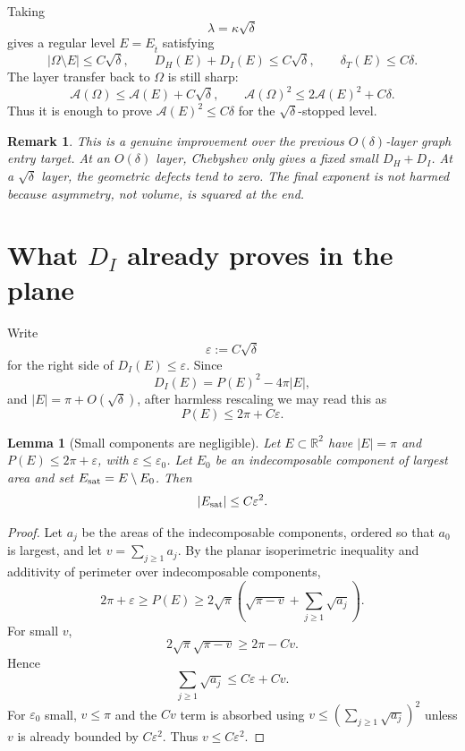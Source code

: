 \documentclass[11pt]{article}
\newtheorem{lemma}[theorem]{Lemma}
\newtheorem{remark}[theorem]{Remark}
\newcommand{\Om}{\Omega}
\newcommand{\R}{\mathbb R}
\newcommand{\dT}{\delta_T}
\newcommand{\A}{\mathcal A}
\newcommand{\Et}{E_{\hat t}}
\begin{document}
Taking
\[
   \lambda=\kappa\sqrt\delta
\]
gives a regular level \(E=\Et\) satisfying
\[
   |\Om\setminus E|\le C\sqrt\delta,\qquad
   D_H(E)+D_I(E)\le C\sqrt\delta,\qquad
   \dT(E)\le C\delta.
   \tag{2.3}
\]
The layer transfer back to \(\Om\) is still sharp:
\[
   \A(\Om)\le \A(E)+C\sqrt\delta,
   \qquad
   \A(\Om)^2\le 2\A(E)^2+C\delta.
   \tag{2.4}
\]
Thus it is enough to prove \(\A(E)^2\le C\delta\) for the
\(\sqrt\delta\)-stopped level.

\begin{remark}
This is a genuine improvement over the previous \(O(\delta)\)-layer graph
entry target.  At an \(O(\delta)\) layer, Chebyshev only gives a fixed small
\(D_H+D_I\).  At a \(\sqrt\delta\) layer, the geometric defects tend to zero.
The final exponent is not harmed because asymmetry, not volume, is squared at
the end.
\end{remark}

\section{What \(D_I\) already proves in the plane}

Write
\[
   \varepsilon:=C\sqrt\delta
\]
for the right side of \(D_I(E)\le\varepsilon\).  Since
\[
   D_I(E)=P(E)^2-4\pi |E|,
\]
and \(|E|=\pi+O(\sqrt\delta)\), after harmless rescaling we may read this as
\[
   P(E)\le 2\pi+C\varepsilon.
   \tag{3.1}
\]

\begin{lemma}[Small components are negligible]\label{lem:components}
Let \(E\subset\R^2\) have \(|E|=\pi\) and \(P(E)\le 2\pi+\varepsilon\), with
\(\varepsilon\le \varepsilon_0\).  Let \(E_0\) be an indecomposable component
of largest area and set \(E_{\rm sat}=E\setminus E_0\).  Then
\[
   |E_{\rm sat}|\le C\varepsilon^2.
\]
\end{lemma}

\begin{proof}
Let \(a_j\) be the areas of the indecomposable components, ordered so that
\(a_0\) is largest, and let \(v=\sum_{j\ge1}a_j\).  By the planar
isoperimetric inequality and additivity of perimeter over indecomposable
components,
\[
   2\pi+\varepsilon\ge P(E)
      \ge 2\sqrt\pi\left(\sqrt{\pi-v}+\sum_{j\ge1}\sqrt{a_j}\right).
\]
For small \(v\),
\[
   2\sqrt\pi\sqrt{\pi-v}
      \ge 2\pi-Cv.
\]
Hence
\[
   \sum_{j\ge1}\sqrt{a_j}\le C\varepsilon+Cv.
\]
For \(\varepsilon_0\) small, \(v\le \pi\) and the \(Cv\) term is absorbed
using \(v\le(\sum_{j\ge1}\sqrt{a_j})^2\) unless \(v\) is already bounded by
\(C\varepsilon^2\).  Thus \(v\le C\varepsilon^2\).
\end{proof}
\end{document}
